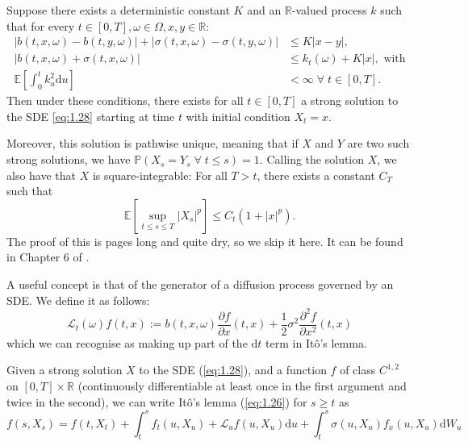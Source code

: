 \begin{theorem}\label{thm:1.6.1}
    Suppose there exists a deterministic constant $K$ and an $\mathbb{R}$-valued process
    $k$ such that for every $t\in[0,T],\omega\in\Omega,x,y\in\mathbb{R}$:
    \begin{align*}
        |b(t,x,\omega)-b(t,y,\omega)|+|\sigma(t,x,\omega)-\sigma(t,y,\omega)|&\leq K|x-y|,\\
        |b(t,x,\omega)+\sigma(t,x,\omega)|&\leq k_t(\omega)+K|x|,\textrm{ with}\\
        \mathbb{E}\left[\int_0^tk_u^2\mathrm du\right]&<\infty\;\forall\;t\in[0,T].
    \end{align*}
    Then under these conditions, there exists for all $t\in[0,T]$ a strong solution 
    to the SDE \ref{eq:1.28} starting at time $t$ with initial condition $X_t=x$.
    
    Moreover, this solution is pathwise unique, meaning that if $X$ and $Y$ are two
    such strong solutions, we have $\mathbb{P}(X_s=Y_s\;\forall\;t\leq s)=1.$ Calling 
    the solution $X$, we also have that $X$ is square-integrable: For all $T>t$, there 
    exists a constant $C_T$ such that
    \begin{equation*}
        \mathbb{E}\left[\sup_{t\leq s\leq T}|X_s|^p\right]\leq C_t(1+|x|^p).
    \end{equation*}
    The proof of this is pages long and quite dry, so we skip it here. It can be found
    in Chapter 6 of \cite{Krylov}.
\end{theorem}

\begin{definition}
    A useful concept is that of the generator of a diffusion process governed by 
    an SDE. We define it as follows:
    \begin{equation}\label{eq:1.14}
        \mathcal{L}_t(\omega)f(t,x):=b(t,x,\omega)\frac{\partial f}{\partial x}(t,x)+\frac{1}{2}\sigma^2\frac{\partial^2f}{\partial x^2}(t,x)
    \end{equation}
    which we can recognise as making up part of the $\mathrm dt$ term in It\^{o}'s lemma.
\end{definition}

\begin{theorem}
    Given a strong solution $X$ to the SDE (\ref{eq:1.28}), and a function $f$ of 
    class $C^{1,2}$ on $[0,T]\times\mathbb{R}$ (continuously differentiable at least 
    once in the first argument and twice in the second), we can write It\^{o}'s lemma 
    (\ref{eq:1.26}) for $s\geq t$ as 
    \begin{equation}\label{eq:1.30}
        f(s,X_s)=f(t,X_t)+\int_t^sf_t(u,X_u)+\mathcal{L}_uf(u,X_u)\mathrm du + \int_t^s\sigma(u,X_u)f_x(u,X_u)\mathrm dW_u
    \end{equation}
\end{theorem}

